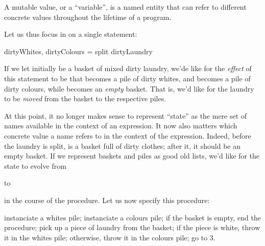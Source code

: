 \begin{definition}

A mutable value, or a ``variable'', is a named entity that can refer to
different concrete values throughout the lifetime of a program.

\end{definition}

Let us thus focus in on a single statement:

\begin{code}
dirtyWhites, dirtyColours = split dirtyLaundry
\end{code}

If we let  initially be a basket of mixed dirty laundry,
we'de like for the \emph{effect} of this statement to be that 
becomes a pile of dirty whites, and  becomes a pile of dirty
colours, while  becomes an \emph{empty} basket. That is, we'd
like for the laundry to be \emph{moved} from the basket to the respective
piles.

At this point, it no longer makes sense to represent ``state'' as the mere set
of names available in the context of an expression. It now also matters which
concrete value a name refers to in the context of the expression.  Indeed,
before the laundry is split,  is a basket full of dirty
clothes; after it, it should be an empty basket. If we represent baskets and
piles as good old lists, we'd like for the state to evolve from

\begin{codebox}
\end{codebox}

to

\begin{codebox}
\end{codebox}

in the course of the  procedure. Let us now specify this procedure:

\begin{codebox}
\li instanciate a whites pile;
\li instanciate a colours pile;
\zi  
\li if the basket is empty, end the procedure;
\zi  
\li pick up a piece of laundry from the basket;
\li if the piece is white, throw it in the whites pile;
\li otherwise, throw it in the colours pile;
\zi  
\li go to 3.
\end{codebox}

